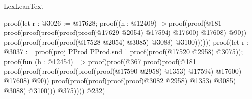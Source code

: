 \begin{lexlean}{LexLeanText}
\begin{coremodule}
                                                    proof(let r : @3026 := @17628;
                                                      proof((h : @12409) ->
                                                        proof(proof(@181
                                                              proof(proof(proof(proof(proof(@17629
                                                                          @2054)
                                                                        @17594)
                                                                      @17600)
                                                                    @17608)
                                                                  @90))
                                                            proof(proof(proof(proof(@17528 @2054)
                                                                    @3085)
                                                                  @3088)
                                                                @3100))))))
                                                proof(let r : @3037 := proof(proj PProd PProd.snd 1
                                                    proof(proof(@17520 @2958) @3075));
                                                  proof(fun (h : @12454) =>
                                                    proof(proof(@367
                                                          proof(proof(@181
                                                                proof(proof(proof(proof(proof(proof(@17590
                                                                              @2958)
                                                                            @1353)
                                                                          @17594)
                                                                        @17600)
                                                                      @17608)
                                                                    @90))
                                                              proof(proof(proof(proof(proof(@3082
                                                                          @2958)
                                                                        @1353)
                                                                      @3085)
                                                                    @3088)
                                                                  @3100)))
                                                        @375))))
                                              @232)

\end{coremodule}
\end{lexlean}
